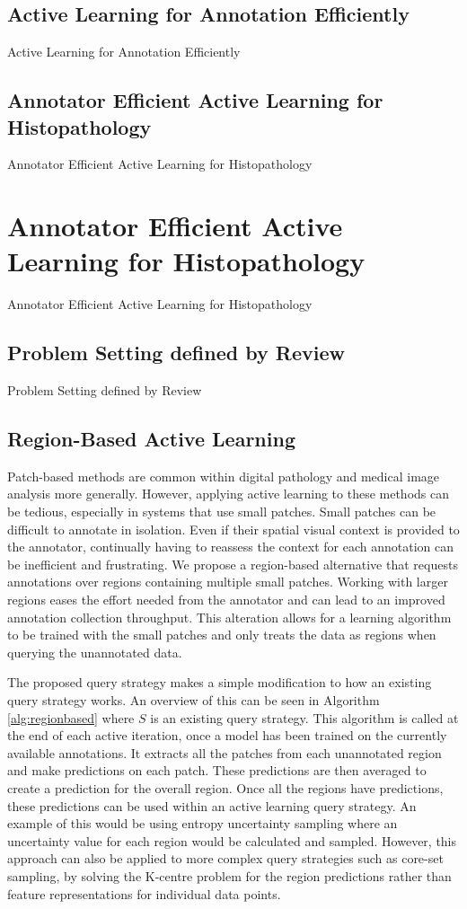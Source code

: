 \subsection{Active Learning for Annotation Efficiently}
Active Learning for Annotation Efficiently

\subsection{Annotator Efficient Active Learning for Histopathology}
Annotator Efficient Active Learning for Histopathology



\section{Annotator Efficient Active Learning for Histopathology}
Annotator Efficient Active Learning for Histopathology

\subsection{Problem Setting defined by Review}
Problem Setting defined by Review

\subsection{Region-Based Active Learning}
Patch-based methods are common within digital pathology and medical image analysis more generally. However, applying active learning to these methods can be tedious, especially in systems that use small patches. Small patches can be difficult to annotate in isolation. Even if their spatial visual context is provided to the annotator, continually having to reassess the context for each annotation can be inefficient and frustrating.  We propose a region-based alternative that requests annotations over regions containing multiple small patches. Working with larger regions eases the effort needed from the annotator and can lead to an improved annotation collection throughput. This alteration allows for a learning algorithm to be trained with the small patches and only treats the data as regions when querying the unannotated data.

The proposed query strategy makes a simple modification to how an existing query strategy works. An overview of this can be seen in Algorithm \ref{alg:regionbased} where \(S\) is an existing query strategy. This algorithm is called at the end of each active iteration, once a model has been trained on the currently available annotations. It extracts all the patches from each unannotated region and make predictions on each patch. These predictions are then averaged to create a prediction for the overall region. Once all the regions have predictions, these predictions can be used within an active learning query strategy. An example of this would be using entropy uncertainty sampling where an uncertainty value for each region would be calculated and sampled. However, this approach can also be applied to more complex query strategies such as core-set sampling, by solving the K-centre problem for the region predictions rather than feature representations for individual data points.

